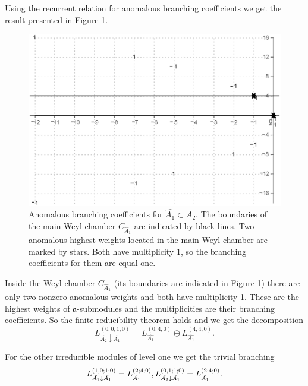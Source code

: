 \documentclass[12pt]{iopart}
\theoremstyle{definition}
\newcommand{\af}{\mathfrak{a}}
\begin{document}
Using the recurrent relation for anomalous branching coefficients
we get the result presented in Figure \ref{fig:AffineA2_A1_branching}.
\begin{figure}[h!tb]
  \centering
  \includegraphics[width=130mm]{figure9.eps}
  \caption{Anomalous branching coefficients for $\hat{A_1}\subset \hat{A_2}$. The boundaries
  of the main Weyl chamber $\bar{C}_{\hat{A}_1}$
 are indicated by black lines. Two anomalous highest weights located
 in the main Weyl chamber are marked by stars.
 Both have multiplicity 1, so the branching coefficients for them are equal one.}
  \label{fig:AffineA2_A1_branching}
\end{figure}
Inside the Weyl chamber $\bar{C}_{\hat{A}_1}$
(its boundaries are indicated in Figure \ref{fig:AffineA2_A1_branching})
there are only two nonzero anomalous weights and both have multiplicity 1.
These are the highest weights of $\af$-submodules and the multiplicities are their branching
coefficients. So the finite reducibility theorem holds and we get the decomposition
\begin{equation*}
  \label{eq:43}
  L^{(0,0;1;0)}_{\hat{A_2}\downarrow \hat{A_1}}= L_{\hat{A_1}}^{(0;4;0)}\oplus L_{\hat{A_1}}^{(4;4;0)}.
\end{equation*}

For the other irreducible modules of level one  we get the trivial
branching
\begin{equation*}
  \label{eq:44}
   L^{(1,0;1;0)}_{\hat{A_2}\downarrow \hat{A_1}}= L_{\hat{A_1}}^{(2;4;0)},\\
   L^{(0,1;1;0)}_{\hat{A_2}\downarrow \hat{A_1}}= L_{\hat{A_1}}^{(2;4;0)}.
\end{equation*}
\end{document}
